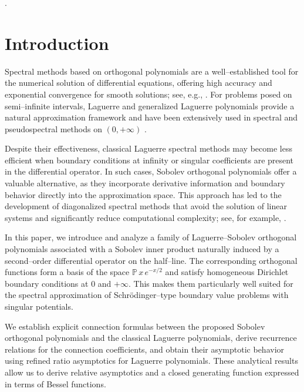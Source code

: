\documentclass[reqno,10pt]{amsart}
\theoremstyle{plain}
\numberwithin{equation}{section}
\numberwithin{figure}{section}
\begin{document}

.

\maketitle

\section{Introduction}

Spectral methods based on orthogonal polynomials are a well--established tool for the numerical solution of differential equations, offering high accuracy and exponential convergence for smooth solutions; see, e.g., \cite{BM97,Canuto06,Funaro}. For problems posed on semi--infinite intervals, Laguerre and generalized Laguerre polynomials provide a natural approximation framework and have been extensively used in spectral and pseudospectral methods on $(0,+\infty)$ \cite{Boyd01,SW09}.  

Despite their effectiveness, classical Laguerre spectral methods may become less efficient when boundary conditions at infinity or singular coefficients are present in the differential operator. In such cases, Sobolev orthogonal polynomials offer a valuable alternative, as they incorporate derivative information and boundary behavior directly into the approximation space. This approach has led to the development of diagonalized spectral methods that avoid the solution of linear systems and significantly reduce computational complexity; see, for example, \cite{Ai18,FMPP24,LWL23}.  

In this paper, we introduce and analyze a family of Laguerre--Sobolev orthogonal polynomials associated with a Sobolev inner product naturally induced by a second--order differential operator on the half--line. The corresponding orthogonal functions form a basis of the space $\mathbb{P}\,x\,e^{-x/2}$ and satisfy homogeneous Dirichlet boundary conditions at $0$ and $+\infty$. This makes them particularly well suited for the spectral approximation of Schr\"odinger--type boundary value problems with singular potentials.  

We establish explicit connection formulas between the proposed Sobolev orthogonal polynomials and the classical Laguerre polynomials, derive recurrence relations for the connection coefficients, and obtain their asymptotic behavior using refined ratio asymptotics for Laguerre polynomials. These analytical results allow us to derive relative asymptotics and a closed generating function expressed in terms of Bessel functions.  
\end{document}
